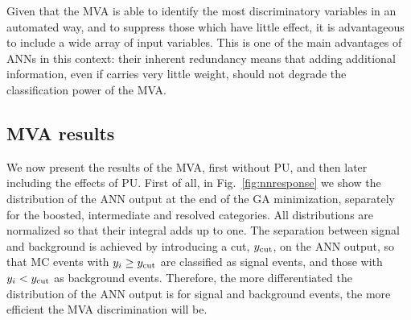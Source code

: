 Given that the MVA is able to identify the most discriminatory variables
in an automated way,
and to suppress those which have little effect, it is advantageous to
include a wide array of input variables.
%
This is one of the main advantages of ANNs in this context: 
their inherent redundancy means that 
adding additional information, even if carries very little weight,
should not degrade
the classification power of the MVA.

\subsection{MVA results}
\label{sec:signalsignificance}

We now present the results of the MVA, first without PU, and then
later including the effects of PU.
%
First of all, in Fig.~\ref{fig:nnresponse} we show the distribution of
the ANN output at the end of the GA minimization,
separately for the
boosted, intermediate and resolved categories.
%
All distributions are normalized so that their integral
  adds up to one.
%
The  separation between signal and background is achieved by introducing
a cut, $y_{\rm cut}$, on the ANN output, so that MC events with $y_i\ge
y_{\rm cut}$ are classified as signal events, and those with
 $y_i <
y_{\rm cut}$ as background events.
%
Therefore,
the more differentiated the distribution of the ANN output is
for signal and background events, the more efficient
the MVA discrimination will be.

